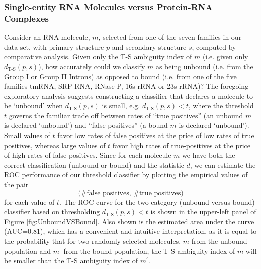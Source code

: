 \documentclass[10pt,letterpaper]{article}
\begin{document}
\subsubsection*{Single-entity RNA Molecules versus Protein-RNA Complexes}
Consider an RNA molecule, $m$, selected from one of the seven families in our data set, with primary structure $p$ and secondary structure $s$, computed by comparative analysis.
Given only the T-S ambiguity index of $m$ (i.e. given only $d_\text{T-S}(p,s)$), 
how accurately could we classify $m$ as being unbound (i.e. from the Group I or Group II Introns) as opposed to bound (i.e. from one of the five families tmRNA, SRP RNA, RNase P, 16s rRNA or 23s rRNA)? 
The foregoing exploratory analysis suggests constructing a classifier that declares a molecule to be `unbound' when $d_\text{T-S}(p,s)$ is small, e.g. $d_\text{T-S}(p,s)<t$, where the threshold $t$ governs the familiar trade off between rates of ``true positives'' (an unbound $m$ is declared `unbound') and ``false positives'' (a bound $m$ is declared `unbound').
Small values of $t$ favor low rates of false positives at the price of low rates of true positives, whereas large values of $t$ favor high rates of true-positives at the price of high rates of false positives. Since for each molecule $m$ we have both the correct classification (unbound or bound) and the statistic $d$, we can estimate the ROC performance of our threshold classifier by plotting the empirical values of the pair
\[
  \text{(\# false positives,\ \# true positives)}
\]
for each value of $t$. The ROC curve for the two-category (unbound versus bound) classifier based on thresholding $d_\text{T-S}(p,s)<t$ is shown in the upper-left panel of Figure \ref{fig:UnboundVSBound}. 
Also shown is the estimated area under the curve (AUC=0.81), which has a convenient and intuitive interpretation, as it is equal to the probability that for two randomly selected molecules, $m$ from the unbound population and $m^\prime$ from the bound population, the T-S ambiguity index of $m$ will be smaller than the T-S ambiguity index of $m^\prime$. 


\end{document}
